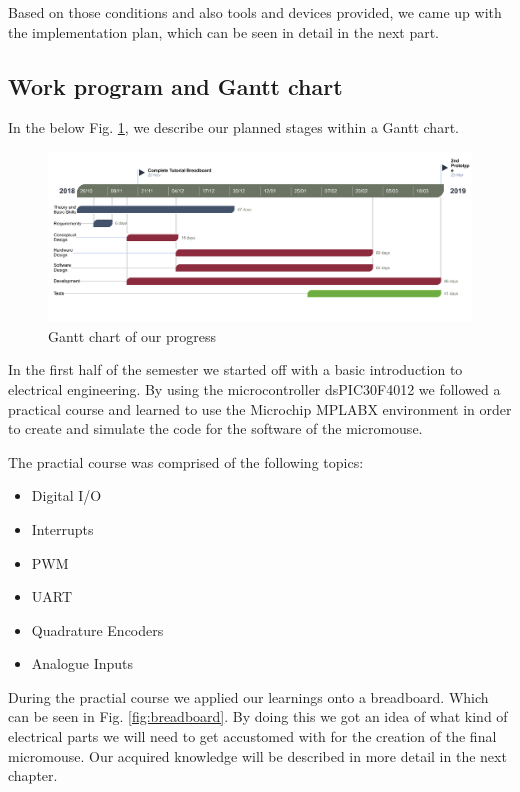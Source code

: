 \noindent
Based on those conditions and also tools and devices provided, we came up with the implementation plan, which can be seen in detail in the next part.

\subsection{Work program and Gantt chart}
In the below Fig. \ref{fig:gantt}, we describe our planned stages within a Gantt chart.

\begin{figure}[H]
    \centering
    \includegraphics[width=1\textwidth]{figures/micromouse-gantt.png}
    \caption{Gantt chart of our progress}
    \label{fig:gantt}
\end{figure}

\noindent
In the first half of the semester we started off with a basic introduction to electrical engineering. By using the microcontroller dsPIC30F4012 we followed a practical course and learned to use the Microchip MPLABX environment in order to create and simulate the code for the software of the micromouse.

\noindent
The practial course was comprised of the following topics:
\begin{itemize}
    \item Digital I/O
    \item Interrupts
    \item PWM
    \item UART
    \item Quadrature Encoders
    \item Analogue Inputs
\end{itemize}

\noindent
During the practial course we applied our learnings onto a breadboard. Which can be seen in Fig. \ref{fig:breadboard}. By doing this we got an idea of what kind of electrical parts we will need to get accustomed with for the creation of the final micromouse. Our acquired knowledge will be described in more detail in the next chapter.

